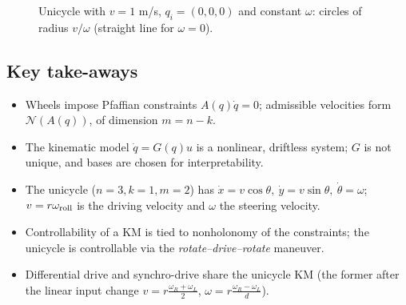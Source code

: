 \documentclass[11pt,a4paper]{article}
\newcommand{\N}{\mathcal{N}}
\newcommand{\dq}{\dot q}
\theoremstyle{definition}
\begin{document}
\begin{figure}[h]
\centering
{}
\caption{Unicycle with $v=1$ m/s, $q_i=(0,0,0)$ and constant $\omega$: circles of radius $v/\omega$ (straight line for $\omega=0$).}
\end{figure}

\subsection*{Key take-aways}
\begin{itemize}
\item Wheels impose Pfaffian constraints $A(q)\dq=0$; admissible velocities form $\N(A(q))$, of dimension $m=n-k$.
\item The kinematic model $\dq=G(q)u$ is a nonlinear, driftless system; $G$ is not unique, and bases are chosen for interpretability.
\item The unicycle ($n=3,k=1,m=2$) has $\dot x=v\cos\theta,\ \dot y=v\sin\theta,\ \dot\theta=\omega$; $v=r\omega_{\rm roll}$ is the driving velocity and $\omega$ the steering velocity.
\item Controllability of a KM is tied to nonholonomy of the constraints; the unicycle is controllable via the \emph{rotate--drive--rotate} maneuver.
\item Differential drive and synchro-drive share the unicycle KM (the former after the linear input change $v=r\frac{\omega_R+\omega_L}2$, $\omega=r\frac{\omega_R-\omega_L}d$).
\end{itemize}
\end{document}
